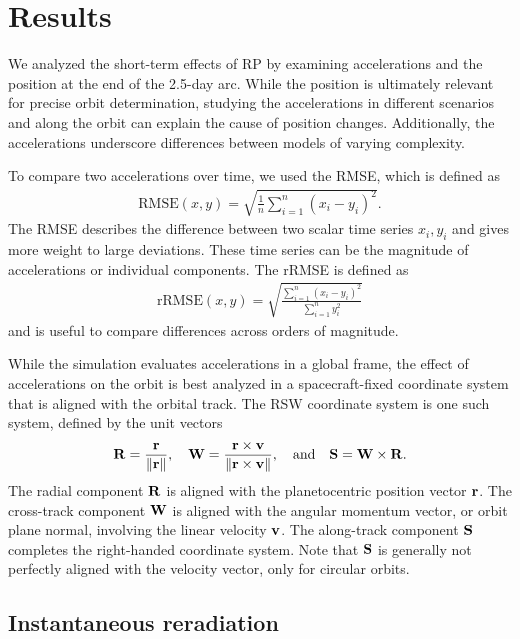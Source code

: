 \section{Results}

We analyzed the short-term effects of \gls{RP} by examining accelerations and the position at the end of the 2.5-day arc. While the position is ultimately relevant for precise orbit determination, studying the accelerations in different scenarios and along the orbit can explain the cause of position changes. Additionally, the accelerations underscore differences between models of varying complexity.

To compare two accelerations over time, we used the \gls{RMSE}, which is defined as
\begin{align}
    \text{RMSE}(x, y) = \sqrt{\frac{1}{n}\sum_{i=1}^{n}\left(x_i - y_i\right)^2}.
\end{align}
The \gls{RMSE} describes the difference between two scalar time series $x_i, y_i$ and gives more weight to large deviations. These time series can be the magnitude of accelerations or individual components. The \gls{rRMSE} is defined as
\begin{align}
    \text{rRMSE}(x, y) = \sqrt{\frac{\sum_{i=1}^{n}\left(x_i - y_i\right)^2}{\sum_{i=1}^{n} y_i^2}}
\end{align}
and is useful to compare differences across orders of magnitude.

While the simulation evaluates accelerations in a global frame, the effect of accelerations on the orbit is best analyzed in a spacecraft-fixed coordinate system that is aligned with the orbital track. The RSW coordinate system is one such system, defined by the unit vectors~\cite{Vallado2013}
\begin{align}
    \vb R = \frac{\vb r}{\norm{\vb r}}, \quad
    \vb W = \frac{\vb r \times \vb v}{\norm{\vb r \times \vb v}},
    \quad \textrm{and} \quad \vb S = \vb W \times \vb R.
\end{align}
The radial component $\vb R$ is aligned with the planetocentric position vector $\vb r$. The cross-track component $\vb W$ is aligned with the angular momentum vector, or orbit plane normal, involving the linear velocity $\vb v$. The along-track component $\vb S$ completes the right-handed coordinate system. Note that $\vb S$ is generally not perfectly aligned with the velocity vector, only for circular orbits.





\subsection{Instantaneous reradiation}
\label{subsec:inst-rerad}

